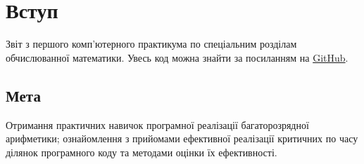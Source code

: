 \documentclass{article}
\begin{document}



\raggedright
\section{Вступ}

Звіт з першого комп'ютерного практикума по спеціальним розділам обчислюванної математики. Увесь код можна знайти за посиланням на \href{https://github.com/avept/Long-Arithmetic}{GitHub}.

\subsection{Мета}
Отримання практичних навичок програмної реалізації багаторозрядної арифметики; ознайомлення з прийомами ефективної реалізації критичних по часу ділянок програмного коду та методами оцінки їх ефективності.
\end{document}
